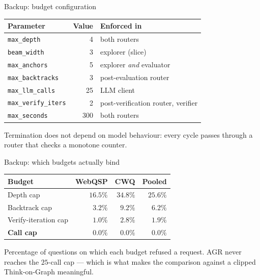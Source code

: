 \documentclass[aspectratio=169,12pt]{beamer}
\begin{document}
\appendix
\begin{frame}{Backup: budget configuration}
  \begin{table}
    \small
    \begin{tabular}{@{}lrL{52mm}@{}}
      \toprule
      \textbf{Parameter} & \textbf{Value} & \textbf{Enforced in} \\
      \midrule
      \texttt{max\_depth}        & 4 & both routers \\
      \texttt{beam\_width}       & 3 & explorer (slice) \\
      \texttt{max\_anchors}      & 5 & explorer \emph{and} evaluator \\
      \texttt{max\_backtracks}   & 3 & post-evaluation router \\
      \texttt{max\_llm\_calls}   & 25 & LLM client \\
      \texttt{max\_verify\_iters}& 2 & post-verification router, verifier \\
      \texttt{max\_seconds}      & 300 & both routers \\
      \bottomrule
    \end{tabular}
  \end{table}
  {\small Termination does not depend on model behaviour: every cycle passes
  through a router that checks a monotone counter.}
\end{frame}

\begin{frame}{Backup: which budgets actually bind}
  \begin{table}
    \small
    \begin{tabular}{@{}lrrr@{}}
      \toprule
      \textbf{Budget} & \textbf{WebQSP} & \textbf{CWQ} & \textbf{Pooled} \\
      \midrule
      Depth cap        & $16.5\%$ & $34.8\%$ & $25.6\%$ \\
      Backtrack cap    & $3.2\%$  & $9.2\%$  & $6.2\%$ \\
      Verify-iteration cap & $1.0\%$ & $2.8\%$ & $1.9\%$ \\
      \textbf{Call cap} & $\mathbf{0.0\%}$ & $\mathbf{0.0\%}$
                        & $\mathbf{0.0\%}$ \\
      \bottomrule
    \end{tabular}
  \end{table}
  {\small Percentage of questions on which each budget refused a request.
  AGR never reaches the $25$-call cap --- which is what makes the comparison
  against a clipped Think-on-Graph meaningful.}
\end{frame}
\end{document}
